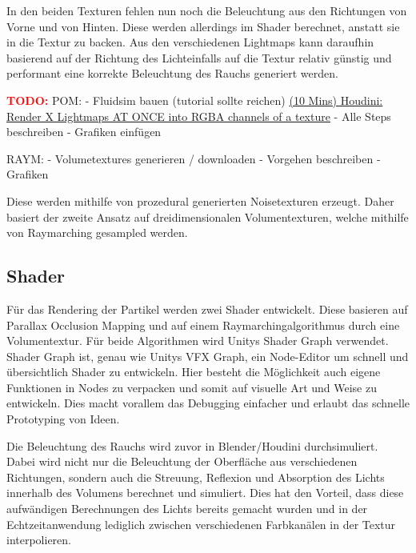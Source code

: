 In den beiden Texturen fehlen nun noch die Beleuchtung aus den Richtungen von Vorne und von Hinten. Diese werden allerdings im Shader
berechnet, anstatt sie in die Textur zu backen. Aus den verschiedenen Lightmaps kann daraufhin basierend auf der Richtung des Lichteinfalls
auf die Textur relativ günstig und performant eine korrekte Beleuchtung des Rauchs generiert werden.



\newpage
\textcolor{red}{\textbf{TODO:}} \newline
POM: \newline
- Fluidsim bauen (tutorial sollte reichen) \href{https://www.youtube.com/watch?v=6bACPGpfItU&t=20s}{(10 Mins) Houdini: Render X Lightmaps AT ONCE into RGBA channels of a texture}\newline
- Alle Steps beschreiben\newline
- Grafiken einfügen\newline

RAYM: \newline
- Volumetextures generieren / downloaden\newline
- Vorgehen beschreiben\newline
- Grafiken \newline

Diese werden mithilfe von prozedural generierten Noisetexturen erzeugt.
Daher basiert der zweite Ansatz auf dreidimensionalen Volumentexturen, welche mithilfe von Raymarching gesampled werden.


\subsection{Shader}
Für das Rendering der Partikel werden zwei Shader entwickelt. Diese basieren auf Parallax Occlusion Mapping und auf einem Raymarchingalgorithmus
durch eine Volumentextur. Für beide Algorithmen wird Unitys Shader Graph verwendet. Shader Graph ist, genau wie Unitys VFX Graph, ein Node-Editor um
schnell und übersichtlich Shader zu entwickeln. Hier besteht die Möglichkeit auch eigene Funktionen in Nodes zu verpacken und somit auf visuelle Art und Weise zu entwickeln.
Dies macht vorallem das Debugging einfacher und erlaubt das schnelle Prototyping von Ideen.

Die Beleuchtung des Rauchs wird zuvor in Blender/Houdini durchsimuliert. Dabei wird nicht nur die Beleuchtung der Oberfläche aus verschiedenen Richtungen, 
sondern auch die Streuung, Reflexion und Absorption des Lichts innerhalb des Volumens berechnet und simuliert. 
Dies hat den Vorteil, dass diese aufwändigen Berechnungen des Lichts bereits gemacht wurden und in der Echtzeitanwendung lediglich zwischen verschiedenen 
Farbkanälen in der Textur interpolieren.



